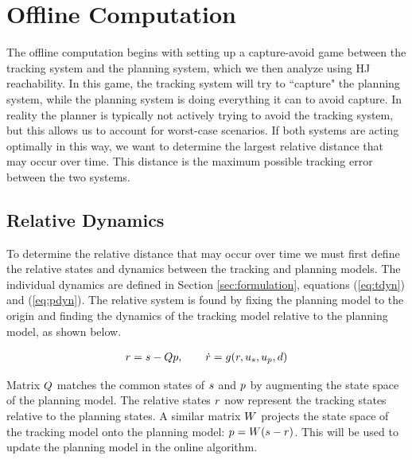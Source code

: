 \section{Offline Computation \label{sec:precomp}}
The offline computation begins with setting up a capture-avoid game between the tracking system and the planning system, which we then analyze using HJ reachability.  In this game, the tracking system will try to ``capture" the planning system, while the planning system is doing everything it can to avoid capture. In reality the planner is typically not actively trying to avoid the tracking system, but this allows us to account for worst-case scenarios. If both systems are acting optimally in this way, we want to determine the largest relative distance that may occur over time. This distance is the maximum possible tracking error between the two systems.

\subsection{Relative Dynamics}
To determine the relative distance that may occur over time we must first define the relative states and dynamics between the tracking and planning models. The individual dynamics are defined in Section \ref{sec:formulation}, equations (\ref{eq:tdyn}) and (\ref{eq:pdyn}). The relative system is found by fixing the planning model to the origin and finding the dynamics of the tracking model relative to the planning model, as shown below.

\begin{equation}
\label{eq:rdyn}
\begin{aligned}
r = s - Qp, \qquad \dot{r} = g(r, u_s, u_p, d)
\end{aligned}
\end{equation}

Matrix $Q$ matches the common states of $s$ and $p$ by augmenting the state space of the planning model. The relative states $r$ now represent the tracking states relative to the planning states. A similar matrix $W$ projects the state space of the tracking model onto the planning model: $p = W(s-r)$. This will be used to update the planning model in the online algorithm.

